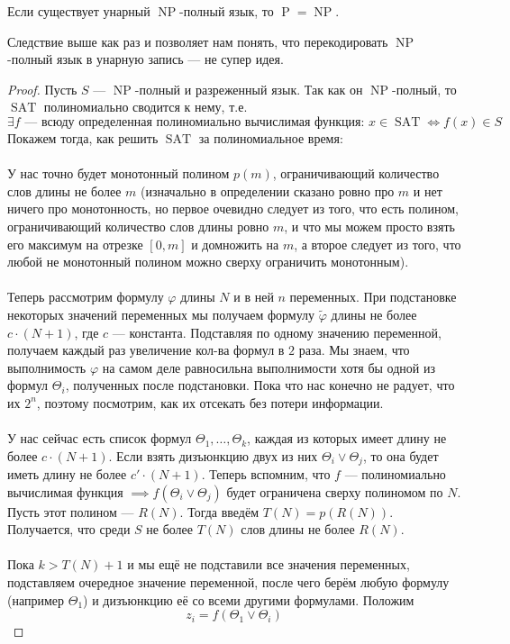 \documentclass[11pt]{article}
\DeclareMathOperator{\SAT}{SAT}
\DeclareMathOperator{\Poly}{P}
\DeclareMathOperator{\NP}{NP}
\begin{document}
\begin{consequence}
  Если существует унарный $\NP$-полный язык, то $\Poly = \NP$.
\end{consequence}

\begin{remark}
  Следствие выше как раз и позволяет нам понять, что перекодировать $\NP$-полный язык в унарную запись --- не супер идея.
\end{remark}

\begin{proof}
  Пусть $S$ --- $\NP$-полный и разреженный язык. Так как он $\NP$-полный, то $\SAT$ полиномиально сводится к нему, т.е. 
  \[\exists f \text{ --- всюду определенная полиномиально вычислимая функция: } x \in \SAT \iff f(x) \in S\]
  Покажем тогда, как решить $\SAT$ за полиномиальное время: \\ \\
  У нас точно будет монотонный полином $p(m)$, ограничивающий количество слов длины не более $m$ 
  (изначально в определении сказано ровно про $m$ и нет ничего про монотонность, но первое очевидно следует из того, 
  что есть полином, ограничивающий количество слов длины ровно $m$, и что мы можем просто взять его максимум на отрезке $[0, m]$ 
  и домножить на $m$, а второе следует из того, что любой не монотонный полином можно сверху ограничить монотонным). \\ \\
  Теперь рассмотрим формулу $\varphi$ длины $N$ и в ней $n$ переменных. При подстановке некоторых значений переменных мы 
  получаем формулу $\widetilde{\varphi}$ длины не более $c \cdot (N + 1)$, где $c$ --- константа. Подставляя по одному значению переменной, 
  получаем каждый раз увеличение кол-ва формул в $2$ раза. Мы знаем, что выполнимость $\varphi$ на самом деле равносильна выполнимости 
  хотя бы одной из формул $\varTheta_{i}$, полученных после подстановки. Пока что нас конечно не радует, что их $2^n$, поэтому посмотрим, 
  как их отсекать без потери информации. \\ \\
  У нас сейчас есть список формул $\varTheta_{1}, \ldots, \varTheta_{k}$, каждая из которых имеет длину не более $c \cdot (N + 1)$. 
  Если взять дизъюнкцию двух из них $\varTheta_{i} \vee \varTheta_{j}$, то она будет иметь длину не более $c' \cdot (N + 1)$. 
  Теперь вспомним, что $f$ --- полиномиально вычислимая функция $\implies f(\varTheta_{i} \vee \varTheta_{j})$ будет ограничена 
  сверху полиномом по $N$. Пусть этот полином --- $R(N)$. Тогда введём $T(N) = p(R(N))$. Получается, что среди $S$ не более $T(N)$ 
  слов длины не более $R(N)$. \\ \\
  Пока $k > T(N) + 1$ и мы ещё не подставили все значения переменных, подставляем очередное значение переменной, 
  после чего берём любую формулу (например $\varTheta_{1}$) и дизъюнкцию её со всеми другими формулами. Положим 
  \[z_i = f(\varTheta_{1} \vee \varTheta_{i})\]

\end{proof}
\end{document}
